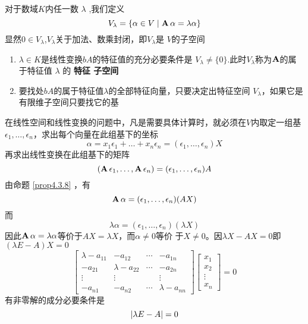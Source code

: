 \documentclass[11pt]{article}
\begin{document}
对于数域\(K\)内任一数 \(\lambda\) ,我们定义
\begin{equation*}
V_\lambda=\{\alpha\in V\mid\operatorname{\textbf{A}}\alpha=\lambda\alpha\}
\end{equation*}
显然\(0\in V_\lambda\),\(V_\lambda\)关于加法、数乘封闭，即\(V_\lambda\)是
\(V\)的子空间
\begin{enumerate}
\item \(\lambda\in K\)是线性变换\(bA\)的特征值的充分必要条件是
\(V_\lambda\neq\{0\}\).此时\(V_\lambda\)称为\(\operatorname{\textbf{A}}\)的属于特征值 \(\lambda\) 的 \textbf{特征
子空间}
\item 要找处\(bA\)的属于特征值\(\lambda\)的全部特征向量，只要决定出特征空间
\(V_\lambda\)，如果它是有限维子空间只要找它的基
\end{enumerate}


在线性空间和线性变换的问题中，凡是需要具体计算时，就必须在\(V\)内取定一组基
\(\epsilon_1,\dots,\epsilon_n\)，求出每个向量在此组基下的坐标
\begin{equation*}
\alpha=x_1\epsilon_1+\dots+x_n\epsilon_n=(\epsilon_1,\dots,\epsilon_n)X
\end{equation*}
再求出线性变换在此组基下的矩阵
\begin{equation*}
(\operatorname{\textbf{A}}\epsilon_1,\dots,\operatorname{\textbf{A}}\epsilon_n)=(\epsilon_1,\dots,\epsilon_n)A
\end{equation*}
由命题 \ref{prop4.3.8} ，有
\begin{equation*}
\operatorname{\textbf{A}}\alpha=(\epsilon_1,\dots,\epsilon_n)(AX)
\end{equation*}
而
\begin{equation*}
\lambda\alpha=(\epsilon_1,\dots,\epsilon_n)(\lambda X)
\end{equation*}
因此\(\operatorname{\textbf{A}}\alpha=\lambda\alpha\)等价于\(AX=\lambda X\)，而\(\alpha\neq0\)等价
于\(X\neq0\)。因\(\lambda X-AX=0\)即\((\lambda E-A)X=0\)
\begin{equation*}
\begin{bmatrix}
\lambda-a_{11}&-a_{12}&\cdots&-a_{1n}\\
-a_{21}&\lambda-a_{22}&\cdots&-a_{2n}\\
\vdots&\vdots&&\vdots\\
-a_{n1}&-a_{n2}&\cdots&\lambda-a_{nn}
\end{bmatrix}
\begin{bmatrix}
x_1\\x_2\\\vdots\\x_n
\end{bmatrix}=0
\end{equation*}
有非零解的成分必要条件是
\begin{equation*}
\abs{\lambda E-A}=0
\end{equation*}
\end{document}

